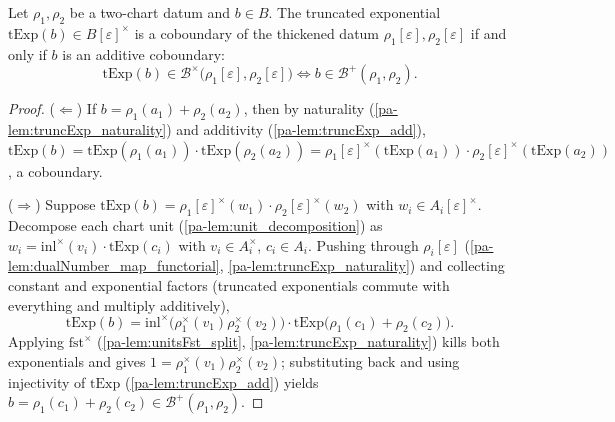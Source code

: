 \begin{theorem}
  \label{pa-thm:truncExp_detects_coboundaries}
  \leanok

  Let \(\rho_1, \rho_2\) be a two-chart datum and \(b \in B\). The truncated
  exponential \(\mathrm{tExp}(b) \in B[\varepsilon]^\times\) is a coboundary of the
  thickened datum \(\rho_1[\varepsilon], \rho_2[\varepsilon]\) if and only if \(b\) is
  an additive coboundary:
  \[
    \mathrm{tExp}(b) \in \mathcal B^\times\bigl(\rho_1[\varepsilon],
      \rho_2[\varepsilon]\bigr)
    \iff
    b \in \mathcal B^+(\rho_1, \rho_2).
  \]
\end{theorem}
\begin{proof}
  \leanok
  (\(\Leftarrow\)) If \(b = \rho_1(a_1) + \rho_2(a_2)\), then by naturality
  (\ref{pa-lem:truncExp_naturality}) and additivity (\ref{pa-lem:truncExp_add}),
  \(\mathrm{tExp}(b) = \mathrm{tExp}(\rho_1(a_1)) \cdot \mathrm{tExp}(\rho_2(a_2)) =
  \rho_1[\varepsilon]^\times(\mathrm{tExp}(a_1)) \cdot
  \rho_2[\varepsilon]^\times(\mathrm{tExp}(a_2))\), a coboundary.

  (\(\Rightarrow\)) Suppose \(\mathrm{tExp}(b) =
  \rho_1[\varepsilon]^\times(w_1) \cdot \rho_2[\varepsilon]^\times(w_2)\) with
  \(w_i \in A_i[\varepsilon]^\times\). Decompose each chart unit
  (\ref{pa-lem:unit_decomposition}) as
  \(w_i = \mathrm{inl}^\times(v_i)\cdot\mathrm{tExp}(c_i)\) with
  \(v_i \in A_i^\times\), \(c_i \in A_i\). Pushing through
  \(\rho_i[\varepsilon]\) (\ref{pa-lem:dualNumber_map_functorial},
  \ref{pa-lem:truncExp_naturality}) and collecting constant and exponential factors
  (truncated exponentials commute with everything and multiply additively),
  \[
    \mathrm{tExp}(b) = \mathrm{inl}^\times\bigl(\rho_1^\times(v_1)\rho_2^\times(v_2)\bigr)
      \cdot \mathrm{tExp}\bigl(\rho_1(c_1) + \rho_2(c_2)\bigr).
  \]
  Applying \(\mathrm{fst}^\times\) (\ref{pa-lem:unitsFst_split},
  \ref{pa-lem:truncExp_naturality}) kills both exponentials and gives
  \(1 = \rho_1^\times(v_1)\rho_2^\times(v_2)\); substituting back and using
  injectivity of \(\mathrm{tExp}\) (\ref{pa-lem:truncExp_add}) yields
  \(b = \rho_1(c_1) + \rho_2(c_2) \in \mathcal B^+(\rho_1, \rho_2)\).
\end{proof}

